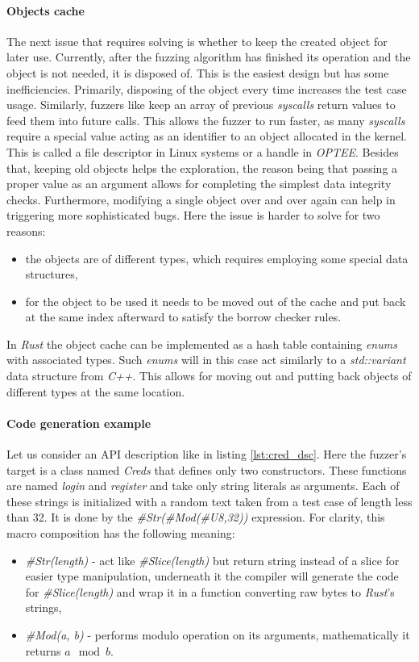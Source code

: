 \paragraph{Objects cache}
The next issue that requires solving is whether to keep the created object for later use. Currently, after the fuzzing algorithm has finished its operation and the object is not needed, it is disposed of. This is the easiest design but has some inefficiencies. Primarily, disposing of the object every time increases the test case usage. Similarly, fuzzers like \cite{opteefuzz} keep an array of previous \textit{syscalls} return values to feed them into future calls. This allows the fuzzer to run faster, as many \textit{syscalls} require a special value acting as an identifier to an object allocated in the kernel. This is called a file descriptor in Linux systems or a handle in \textit{OPTEE}. Besides that, keeping old objects helps the exploration, the reason being that passing a proper value as an argument allows for completing the simplest data integrity checks. Furthermore, modifying a single object over and over again can help in triggering more sophisticated bugs. Here the issue is harder to solve for two reasons:
\begin{itemize}
    \item the objects are of different types, which requires employing some special data structures,
    \item for the object to be used it needs to be moved out of the cache and put back at the same index afterward to satisfy the borrow checker rules.
\end{itemize}
In \textit{Rust} the object cache can be implemented as a hash table containing \textit{enums} with associated types. Such \textit{enums} will in this case act similarly to a \textit{std::variant} data structure from \textit{C++}. This allows for moving out and putting back objects of different types at the same location.


\paragraph{Code generation example}
Let us consider an API description like in listing \ref{lst:cred_dsc}. Here the fuzzer's target is a class named \textit{Creds} that defines only two constructors. These functions are named \textit{login} and \textit{register} and take only string literals as arguments. Each of these strings is initialized with a random text taken from a test case of length less than 32. It is done by the \textit{\#Str(\#Mod(\#U8,32))} expression. For clarity, this macro composition has the following meaning:
\begin{itemize}
    \item \textit{\#Str(length)} - act like \textit{\#Slice(length)} but return string instead of a slice for easier type manipulation, underneath it the compiler will generate the code for \textit{\#Slice(length)} and wrap it in a function converting raw bytes to \textit{Rust}'s strings,
    \item \textit{\#Mod(a, b)} - performs modulo operation on its arguments, mathematically it returns $a \mod b$.
\end{itemize}

